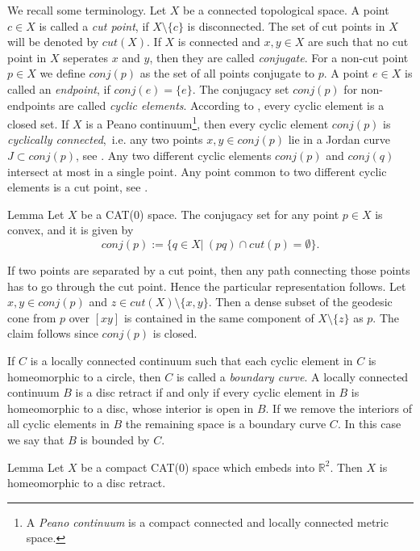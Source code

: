 \documentclass[a4paper,10pt]{amsart}
\begin{document}
We recall some terminology. Let $X$ be a connected topological space. A point $c\in X$
is called a {\em cut point}, if $X\setminus \{c\}$ is disconnected. The set of cut points in $X$ 
will be denoted by $cut(X)$. If $X$ is connected and $x,y\in X$ are such that no cut point in $X$
seperates $x$ and $y$, then they are called {\em conjugate}. For a non-cut point $p\in X$
we define $conj(p)$ as the set of all points conjugate to $p$. A point $e\in X$ is called an {\em endpoint},
if $conj(e)=\{e\}$. The conjugacy set $conj(p)$ for non-endpoints
are called {\em cyclic elements}. 
According to \cite[IV(1.4)]{W2},
every cyclic element is a closed set. 
If $X$ is a 
Peano continuum\footnote{A {\em Peano continuum} is a compact
connected and locally connected metric space.}, then every cyclic element $conj(p)$ is {\em cyclically connected},\ i.e.
any two points $x,y\in conj(p)$ lie in a Jordan curve $J\subset conj(p)$, see \cite[III(3.32)]{Wi}. 
Any two different 
cyclic elements $conj(p)$ and $conj(q)$ intersect at most in a single point. 
Any point common to two 
different cyclic elements is a cut point, see \cite[IV(1.4)]{W2}.

\begin{thm}{Lemma}
Let $X$ be a CAT(0) space. The conjugacy set for any point $p\in X$ is convex, and it is given by
$$
conj(p):=\{q\in X|\ (pq)\cap cut(p)=\emptyset \}.
$$

\end{thm}

If two points are separated by a cut point, then any path connecting those points has to go through the cut point.
Hence the particular representation follows. Let $x,y\in conj(p)$ and $z\in cut(X)\setminus\{x,y\}$. Then a dense subset
of the geodesic cone from $p$ over $[xy]$ is contained in the same component of $X\setminus \{z\}$ as $p$. 
The claim follows since $conj(p)$ is closed.
\qeds

If $C$ is a locally connected continuum such that 
each cyclic element in $C$ is homeomorphic to a circle, then $C$ is
called a {\em boundary curve}. 
A locally connected
continuum $B$ is a disc retract if and only if every cyclic element in $B$ is homeomorphic to a disc,
whose interior is open in $B$. If we remove the interiors of all cyclic elements in $B$ the remaining
space is a boundary curve $C$. In this case we say that $B$ is bounded by $C$.


\begin{thm}{Lemma}
 Let $X$ be a compact CAT(0) space which embeds into $\mathbb{R}^2$. Then $X$
 is homeomorphic to a disc retract.
\end{thm}
\end{document}
